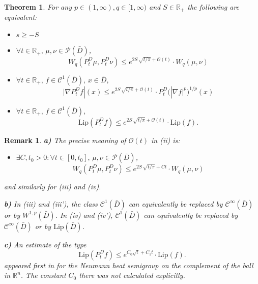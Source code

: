 \documentclass[a4paper,12pt]{article}
\theoremstyle{plain}
\newtheorem{theorem}[thm]{Theorem}
\newtheorem{remark}[thm]{Remark}
\def\R{{\mathbb R}}
\def\R{{\mathbb R}}%
\begin{document}

\begin{theorem}\label{main}
For any $p\in (1,\infty), q\in [1,\infty)$ and $S\in\R_+$ the following are equivalent:
\begin{itemize}
\item[(i)] $s\ge -S$
\item[(ii)] $\forall  t\in\R_+, \, \mu,\nu\in\mathcal{P}(\bar D)$,
$$W_q(P^D_t\mu,P^D_t\nu)\le e^{2S \, \sqrt{t/\pi}+\mathcal{O}(t)}\cdot W_q(\mu,\nu)$$
\item[(iii)] $\forall  t\in\R_+, \, f\in\mathcal{C}^1(\bar D), \, x\in \bar D$,
$$\big|\nabla P^D_tf|(x)\le e^{2S \, \sqrt{t/\pi}+\mathcal{O}(t)}\cdot P^D_t\big(|\nabla f|^p\big)^{1/p}(x)$$
\item[(iv)]
$\forall  t\in\R_+, \, f\in\mathcal{C}^1(\bar D)$,
$$\text{Lip}( P^D_tf)\le e^{2S \, \sqrt{t/\pi}+\mathcal{O}(t)}\cdot \text{Lip} (f).$$
\end{itemize}
\end{theorem}

\begin{remark}
{\bf a)}
The precise meaning of $\mathcal{O}(t)$ in (ii) %
 is: 
\begin{itemize}
\item[(ii')] $\exists C, t_0>0:  \forall  t\in [0,t_0], \, \mu,\nu\in\mathcal{P}(\bar D)$,
$$W_q(P^D_t\mu,P^D_t\nu)\le e^{2S \, \sqrt{t/\pi}+Ct}\cdot W_q(\mu,\nu)$$
\end{itemize}
and similarly for (iii) and (iv).

{\bf b)}
In (iii) and (iii'), the class $\mathcal{C}^1(\bar D)$ can equivalently be replaced by $\mathcal{C}^\infty(\bar D)$ or by $W^{1,p}(\bar D)$.
In (iv) and (iv'),  $\mathcal{C}^1(\bar D)$ can equivalently be replaced by $\mathcal{C}^\infty(\bar D)$ or by $\text{Lip}(\bar D)$.

{\bf c)}
An estimate of the type
$$\text{Lip}( P^D_tf)\le e^{C_0 \sqrt{t}+C_1t}\cdot \text{Lip} (f).$$
appeared first in \cite{St-distr} for the Neumann heat semigroup on the complement of the ball in $\R^n$. The constant $C_0$ there was not calculated explicitly.
\end{remark}
\end{document}
